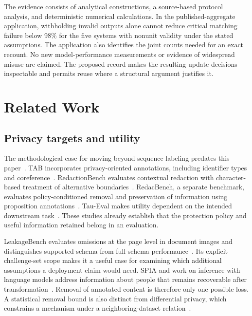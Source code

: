 \documentclass[conference]{IEEEtran}
\begin{document}
The evidence consists of analytical constructions, a source-based protocol analysis, and deterministic numerical calculations. In the published-aggregate application, withholding invalid outputs alone cannot reduce critical matching failure below 98\% for the five systems with nonunit validity under the stated assumptions. The application also identifies the joint counts needed for an exact recount. No new model-performance measurements or evidence of widespread misuse are claimed. The proposed record makes the resulting update decisions inspectable and permits reuse where a structural argument justifies it.

\section{Related Work}
\subsection{Privacy targets and utility}
The methodological case for moving beyond sequence labeling predates this paper~\cite{lison2021}. TAB incorporates privacy-oriented annotations, including identifier types and coreference~\cite{tab2022}. RedactionBench evaluates contextual redaction with character-based treatment of alternative boundaries~\cite{redactionbench2026}. RedacBench, a separate benchmark, evaluates policy-conditioned removal and preservation of information using proposition annotations~\cite{redacbench2026}. Tau-Eval makes utility dependent on the intended downstream task~\cite{taueval2025}. These studies already establish that the protection policy and useful information retained belong in an evaluation.

LeakageBench evaluates omissions at the page level in document images and distinguishes supported-schema from full-schema performance~\cite{leakagebench2026}. Its explicit challenge-set scope makes it a useful case for examining which additional assumptions a deployment claim would need. SPIA and work on inference with language models address information about people that remains recoverable after transformation~\cite{spia2026,staab2024}. Removal of annotated content is therefore only one possible loss. A statistical removal bound is also distinct from differential privacy, which constrains a mechanism under a neighboring-dataset relation~\cite{dwork2014}.
\end{document}
